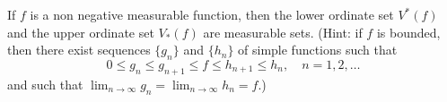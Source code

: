 If $f$ is a non negative measurable function, then the lower ordinate set $V^*(f)$ and the upper ordinate set $V_*(f)$ are measurable sets. (Hint: if $f$ is bounded, then there exist sequences $\{g_n\}$ and $\{h_n\}$ of simple functions such that
$$0 \leq g_n \leq g_{n+1} \leq f \leq h_{n+1} \leq h_n, \quad n = 1, 2, \dots$$
and such that $\lim_{n \to \infty} g_n = \lim_{n \to \infty} h_n = f$.)
